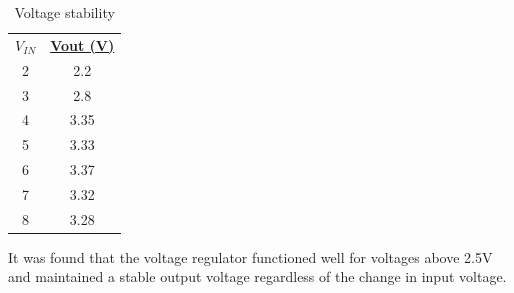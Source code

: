 \begin{table}[H]
\centering
    \begin{tabular}{|c| c|}
    \hline
      \textbf{\underline{$V_{IN}$}}  & \textbf{\underline{Vout (V)}}\\
       2 & 2.2  \\
       3 & 2.8 \\
       4 & 3.35\\
       5 & 3.33\\
       6 & 3.37\\
       7 & 3.32\\
       8 & 3.28\\
      \hline
    \end{tabular}
    \caption{Voltage stability}
\end{table}
It was found that the voltage regulator functioned well for voltages above 2.5V and maintained a stable output voltage regardless of the change in input voltage.